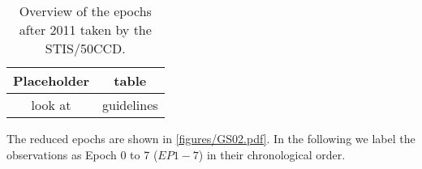 \documentclass{aa}
\begin{document}
\begin{table}[ht]
    \centering
    \caption{Overview of the epochs after 2011 taken by the STIS/50CCD.}
    \label{tab:epoch_info}
    \begin{tabular}{c|c}
        Placeholder & table \\ \hline
        look at & guidelines
    \end{tabular}
\end{table}

The reduced epochs are shown in \autoref{figures/GS02.pdf}. In the following we label the observations as Epoch 0 to 7 ($EP{1-7}$) in their chronological order.

\end{document}
